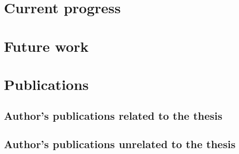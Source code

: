 \documentclass[11pt]{article}
\begin{document}
\section{Current progress}
\label{sec:current_progress}


\section{Future work}
\label{sec:future-work}


\section{Publications}
\label{sec:publications}\nocite{*}

\subsection*{Author's publications related to the thesis}
\printbibliography[keyword=related,heading=none]

\subsection*{Author's publications unrelated to the thesis}
\printbibliography[keyword=unrelated,heading=none]

\printbibliography[keyword=foreign]
\end{document}

